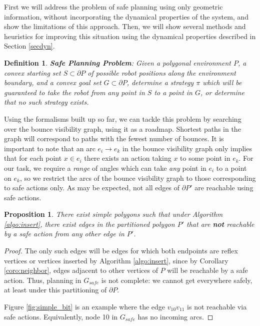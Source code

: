 \documentclass[]{article}
\newtheorem{proposition}{Proposition}
\newtheorem{definition}{Definition}
\begin{document}
First we will address the problem of safe planning using only geometric information, without
incorporating the dynamical properties of the system, and show the limitations
of this approach. Then, we will show several methods and heuristics for
improving this situation using the dynamical properties described in Section
\ref{secdyn}.

\begin{definition}
\textbf{Safe Planning Problem}:
Given a polygonal environment $P$, a convex starting set $S \subset \partial P$ of possible robot positions along the
environment boundary, and a convex goal set $G \subset \partial P$, determine a strategy $\pi$ which
will be guaranteed to take the robot from any point in $S$ to a point in $G$, or
determine that no such strategy exists.
\end{definition}

Using the formalisms built up so far, we can tackle this problem by searching over
the bounce visibility graph, using it as a roadmap. Shortest paths in the graph 
will correspond to paths with the fewest number of bounces. It is important to
note that an arc $e_i \to e_k$ in the bounce visibility graph only implies that for each
point $x \in e_i$ there exists an action taking $x$ to some point in $e_k$. For
our task, we require a {\em range} of angles which can take {\em any}
point in $e_i$ to a point on $e_k$, so we restrict the arcs of the bounce
visibility graph to those corresponding to safe actions only. As may be
expected, not all edges of $\partial P'$ are reachable using safe actions.

\begin{proposition}
There exist simple polygons such that under Algorithm \ref{algo:insert}, there
exist edges in the partitioned polygon $P'$ that are \textbf{not} reachable by 
a safe action from any other edge in $P'$.
\end{proposition}

\begin{proof}
The only such edges will be
edges for which both endpoints are reflex vertices or vertices inserted by Algorithm
\ref{algo:insert}, since by Corollary \ref{coro:neighbor},
edges adjacent to other vertices of $P$ will be reachable by a safe
action. Thus, planning in $G_{safe}$ is not complete: we cannot
get everywhere safely, at least under this partitioning of $\partial P$.

Figure \ref{fig:simple_bit} is an example where the edge
$v_{10} v_{11}$ is not reachable via safe actions. Equivalently,
node 10 in $G_{safe}$ has no incoming arcs.
\end{proof}
\end{document}
